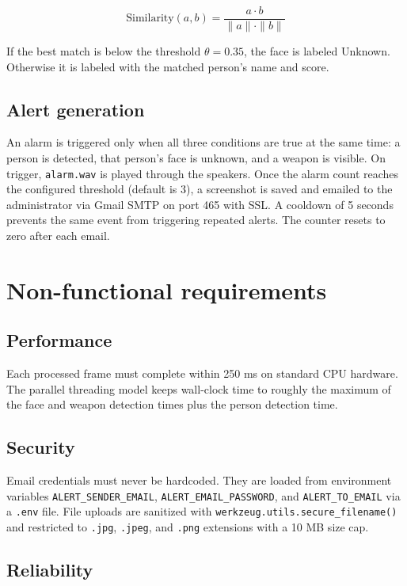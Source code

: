 \documentclass[12pt,a4paper]{report}
\begin{document}
\[
\text{Similarity}(a, b) = \frac{a \cdot b}{\|a\| \cdot \|b\|}
\]

If the best match is below the threshold $\theta = 0.35$, the face is labeled Unknown. Otherwise it is labeled with the matched person's name and score.

\subsection{Alert generation}

An alarm is triggered only when all three conditions are true at the same time: a person is detected, that person's face is unknown, and a weapon is visible. On trigger, \texttt{alarm.wav} is played through the speakers. Once the alarm count reaches the configured threshold (default is 3), a screenshot is saved and emailed to the administrator via Gmail SMTP on port 465 with SSL. A cooldown of 5 seconds prevents the same event from triggering repeated alerts. The counter resets to zero after each email.

\section{Non-functional requirements}

\subsection{Performance}

Each processed frame must complete within 250 ms on standard CPU hardware. The parallel threading model keeps wall-clock time to roughly the maximum of the face and weapon detection times plus the person detection time.

\subsection{Security}

Email credentials must never be hardcoded. They are loaded from environment variables \texttt{ALERT\_SENDER\_EMAIL}, \texttt{ALERT\_EMAIL\_PASSWORD}, and \texttt{ALERT\_TO\_EMAIL} via a \texttt{.env} file. File uploads are sanitized with \texttt{werkzeug.utils.secure\_filename()} and restricted to \texttt{.jpg}, \texttt{.jpeg}, and \texttt{.png} extensions with a 10 MB size cap.

\subsection{Reliability}
\end{document}
